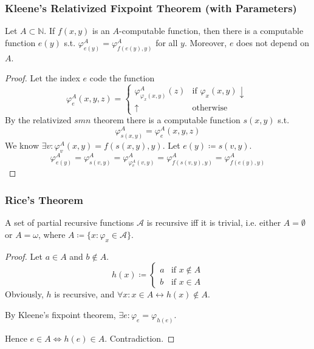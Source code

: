 \documentclass[UTF8,11pt,colorlinks,compress,openany]{beamer}%
\begin{document}
\begin{frame}\frametitle{Kleene's Relativized Fixpoint Theorem (with Parameters)}
\setlength\abovedisplayskip{0pt}
\setlength\belowdisplayskip{0pt}
\begin{theorem}
Let $A\subset\mathbb{N}$. If $f(x,y)$ is an $A$-computable function, then there is a computable function $e(y)$ s.t. $\varphi_{e(y)}^A=\varphi_{f(e(y),y)}^A$ for all $y$. Moreover, $e$ does not depend on $A$.
\end{theorem}
\begin{proof}
Let the index $e$ code the function
\[\varphi_e^A(x,y,z)=
\begin{cases}
\varphi_{\varphi_x(x,y)}^A(z) &\mbox{if } \varphi_x(x,y)\downarrow\\
\uparrow &\mbox{otherwise}
\end{cases}
\]
By the relativized $smn$ theorem there is a computable function $s(x,y)$ s.t.
\[\varphi_{s(x,y)}^A=\varphi_e^A(x,y,z)\]
We know $\exists v: \varphi_v^A(x,y)=f(s(x,y),y)$. Let $e(y)\coloneqq s(v,y)$.
\[\varphi_{e(y)}^A=\varphi_{s(v,y)}^A=\varphi_{\varphi_v^A(v,y)}^A=\varphi_{f(s(v,y),y)}^A=\varphi_{f(e(y),y)}^A\]
\end{proof}
\end{frame}

\begin{frame}\frametitle{Rice's Theorem}
	\begin{theorem}
		A set of partial recursive functions $\mathcal{A}$ is recursive iff it is trivial, i.e. either $A=\emptyset$ or $A=\omega$, where $A\coloneqq \{x:\varphi_x\in\mathcal{A}\}$.
	\end{theorem}
	\begin{proof}
		Let $a\in A$ and $b\notin A$.
		\[h(x)\coloneqq \begin{cases}
		a &\mbox{if } x\notin A\\
		b &\mbox{if } x\in A
		\end{cases}\]
		Obviously, $h$ is recursive, and $\forall x: x\in A\leftrightarrow h(x)\notin A$.
		
		By Kleene's fixpoint theorem, $\exists e: \varphi_e=\varphi_{h(e)}$.
		
		Hence $e\in A\iff h(e)\in A$. Contradiction.
	\end{proof}
\end{frame}
\end{document}
